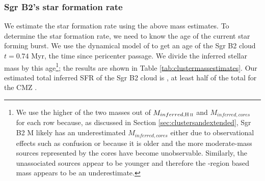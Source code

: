 \documentclass[twocolumn]{aastex61}
\begin{document}
\subsubsection{Sgr B2's star formation rate}
We estimate the star formation rate using the above mass estimates.  To
determine the star formation rate, we need to know the age of the current star
forming burst.  We use the dynamical model of \citet{Kruijssen2015a} to get an
age of the Sgr B2 cloud $t=0.74$ Myr, the time since
pericenter passage.  We divide the inferred stellar mass by this
age\footnote{We use the higher of the two masses out of $M_{inferred,\hii}$ and
$M_{inferred,cores}$ for each row because, as discussed in Section
\ref{sec:clustersandextended}, Sgr B2 M likely has an underestimated
$M_{inferred,cores}$ either due to observational effects such as confusion or
because it is older and the more moderate-mass sources represented by the cores
have become unobservable.  Similarly, the unassociated sources appear
to be younger and therefore the \hii-region based mass appears
to be an underestimate.}; the results are shown in Table
\ref{tab:clustermassestimates}.    Our estimated total inferred SFR of the Sgr
B2 cloud is \sfrdynagemax \msun \peryr,  at least half of the
total for the CMZ \citep[$\dot{M}_{CMZ}=0.07-0.12$ \msun
\peryr;][]{Longmore2013b,Barnes2017b}.  
\end{document}
